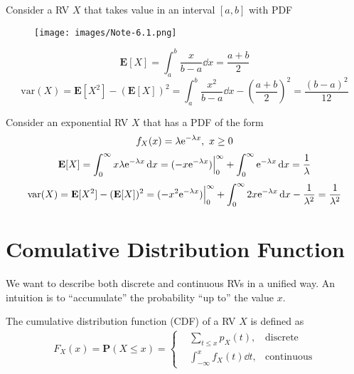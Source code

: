 \begin{example}[Uniform RV]
    Consider a RV $X$ that takes value in an interval $[a, b]$ with PDF
    \begin{figure}[H]
        \centering
        \texttt{[image: images/Note-6.1.png]}
    \end{figure}
    \vspace{-2em}
    \begin{equation}
        \mathbf{E}[X] = \int_{a}^{b} \frac{x}{b - a} \dd{x} = \frac{a + b}{2}
    \end{equation}
    \begin{equation}
        \text{var}(X) = \mathbf{E}[X^2] - (\mathbf{E}[X])^2 = \int_{a}^{b} \frac{x^2}{b - a} \dd{x} - \left(\frac{a + b}{2}\right)^2 = \frac{(b - a)^2}{12}
    \end{equation}
\end{example}

\begin{example}[Exponential RV]
    Consider an exponential RV $X$ that has a PDF of the form
    \begin{equation}
        f_{X}(x) = \lambda \mathrm{e}^{-\lambda x},~ x \geq 0
    \end{equation}
    \begin{equation}
        \mathbf{E}[X] = \int_{0}^{\infty} x \lambda \mathrm{e}^{-\lambda x} \dd{x} = (-x \mathrm{e}^{-\lambda x}) \Big|_{0}^{\infty} + \int_{0}^{\infty} \mathrm{e}^{-\lambda x} \dd{x} = \frac{1}{\lambda}
    \end{equation}
    \begin{equation}
        \text{var}(X) = \mathbf{E}[X^2] - (\mathbf{E}[X])^2 = (-x^2 \mathrm{e}^{-\lambda x}) \Big|_{0}^{\infty} + \int_{0}^{\infty} 2x \mathrm{e}^{-\lambda x} \dd{x} - \frac{1}{\lambda^2} = \frac{1}{\lambda^2}
    \end{equation}
\end{example}


\section{Comulative Distribution Function}
We want to describe both discrete and continuous RVs in a unified way. An intuition is to ``accumulate'' the probability ``up to'' the value $x$.

\begin{definition}[CDF]
    The cumulative distribution function (CDF) of a RV $X$ is defined as
    \begin{align}
        F_{X}(x) = \mathbf{P}(X \leq x) = \left\{
        \begin{aligned}
            &\sum_{t \leq x} p_{X}(t), &\text{discrete} \\ 
            &\int_{-\infty}^{x} f_{X}(t) \dd{t}, &\text{continuous}
        \end{aligned}
        \right.
    \end{align}
\end{definition}

